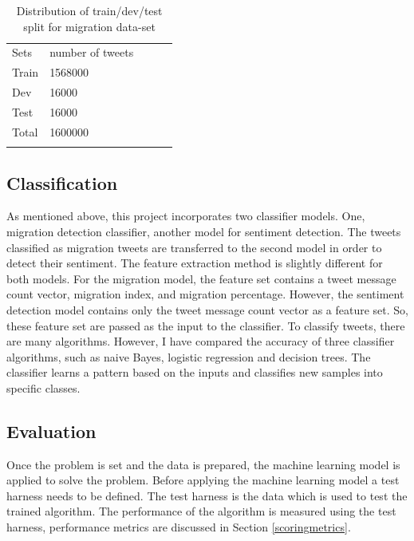 \begin{table}[]
\centering
\begin{tabular}{lllll}
\cline{1-2}
\multicolumn{1}{|l|}{Sets}   & \multicolumn{1}{l|}{number of tweets} &  &  &  \\ \cline{1-2}
\multicolumn{1}{|l|}{Train} & \multicolumn{1}{l|}{1568000}  &  &  &  \\ \cline{1-2}
\multicolumn{1}{|l|}{Dev} & \multicolumn{1}{l|}{16000 }  &  &  &  \\ \cline{1-2}
\multicolumn{1}{|l|}{Test} & \multicolumn{1}{l|}{16000 }  &  &  &  \\ \cline{1-2}
\multicolumn{1}{|l|}{Total}   & \multicolumn{1}{l|}{1600000}  &  &  &  \\ \cline{1-2}
                            &                           &  &  & 
\label{tab:Distribution of sentiment class}
\end{tabular}
\caption{Distribution of train/dev/test split for migration data-set}
\label{tab:Distsentimentdatset}
\end{table}


\subsection{Classification}
As mentioned above, this project incorporates two classifier models. One, migration detection classifier, another model for sentiment detection. The tweets classified as migration tweets are transferred to the second model in order to detect their sentiment. The feature extraction method is slightly different for both models. For the migration model, the feature set contains a tweet message count vector, migration index, and migration percentage. However, the sentiment detection model contains only the tweet message count vector as a feature set. So, these feature set are passed as the input to the classifier. To classify tweets, there are many algorithms. However, I have compared the accuracy of three classifier algorithms, such as naive Bayes, logistic regression and decision trees. The classifier learns a pattern based on the inputs and classifies new samples into specific classes.



\subsection{Evaluation} \label{eval}
Once the problem is set and the data is prepared, the machine learning model is applied to solve the problem. Before applying the machine learning model a test harness needs to be defined. The test harness is the data which is used to test the trained algorithm. The performance of the algorithm is measured using the test harness, performance metrics are discussed in Section \ref{scoringmetrics}.

